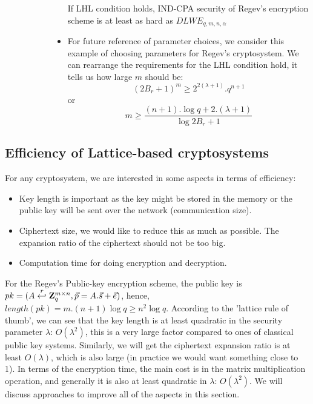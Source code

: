 \begin{description}
\begin{description}
\begin{itemize}
      \begin{theorem}
        If LHL condition holds, IND-CPA security of Regev's encryption scheme is
        at least as hard as $DLWE_{q,m,n,\alpha}$
        \label{theo:IndCPARegev}
      \end{theorem}
    \item For future reference of parameter choices, we consider this example of
      choosing parameters for Regev's cryptosystem. We can rearrange the
      requirements for the LHL condition hold, it tells us how large $m$ should
      be:
      \[
        (2B_r + 1 )^m \geq 2^{2(\lambda + 1)}.q^{n+1}
      \]
      or
      \[
        m \geq \frac{(n+1).\log q + 2.(\lambda+1)}{\log{2B_r + 1}}
      \]

    \end{itemize}

  \end{description}

\end{description}

\subsection{Efficiency of Lattice-based cryptosystems}
\label{sec:latticeEfficiency}

For any cryptosystem, we are interested in some aspects in terms of efficiency:
\begin{itemize}
\item Key length is important as the key might be stored in the memory or the
  public key will be sent over the network (communication size).
\item Ciphertext size, we would like to reduce this as much as possible. The
  expansion ratio of the ciphertext should not be too big.
\item Computation time for doing encryption and decryption.
\end{itemize}
For the Regev's Public-key encryption scheme, the public key is
$pk=(A \stackrel{r}{\hookleftarrow} \mathbf{Z}_q^{m \times n}, \vec{p} = A.\vec{s} + \vec{e})$,
hence, $length(pk) = m.(n+1)\log q \geq n^2\log q$. According to the 'lattice
rule of thumb', we can see that the key length is at least quadratic in the
security parameter $\lambda$: $O(\lambda^2)$, this is a very large factor
compared to ones of classical public key systems.  Similarly, we will get the
ciphertext expansion ratio is at least $O(\lambda)$, which is also large (in
practice we would want something close to 1). In terms of the encryption time,
the main cost is in the matrix multiplication operation, and generally it is
also at least quadratic in $\lambda$: $O(\lambda^2)$. We will discuss approaches
to improve all of the aspects in this section.

